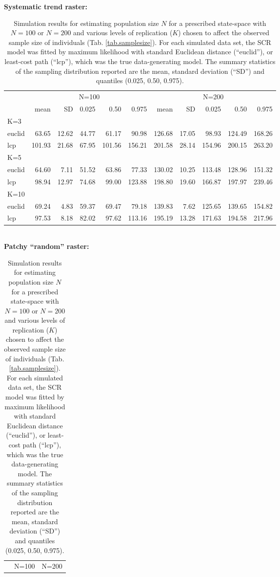 \begin{table}[htp]
\label{tab.results1}
{\small
\caption{Simulation results for estimating population size $N$ for a prescribed state-space with
$N=100$ or $N=200$ and various levels of replication ($K$) chosen to affect the observed sample
size of individuals (Tab. \ref{tab.samplesize}). For each simulated
data set, the SCR model was fitted by maximum likelihood with
standard Euclidean distance (``euclid''), or least-cost path
(``lcp''), which was the true data-generating model.
The summary statistics of the
sampling distribution reported are the mean, standard deviation
(``SD'') and quantiles (0.025, 0.50, 0.975).
}
{\bf Systematic trend raster:} \\
\begin{tabular}{l|rrrrr|rrrrr}
         & \multicolumn{5}{c}{N=100   } & \multicolumn{5}{c}{N=200  }  \\
         &   mean &  SD  & 0.025 & 0.50 & 0.975  & mean  & SD   & 0.025 & 0.50  & 0.975 \\ \hline
K=3      &        &      &       &      &        &       &      &       &       &       \\
euclid   &   63.65& 12.62& 44.77 & 61.17&  90.98 & 126.68& 17.05&  98.93& 124.49& 168.26 \\
lcp      &  101.93& 21.68& 67.95 &101.56& 156.21 & 201.58& 28.14& 154.96& 200.15& 263.20\\
K=5      &        &      &       &      &        &       &      &       &       &        \\
euclid   &  64.60 & 7.11 & 51.52 & 63.86&  77.33 & 130.02& 10.25& 113.48& 128.96& 151.32\\
lcp      &  98.94 &12.97 & 74.68 & 99.00& 123.88 & 198.80& 19.60& 166.87& 197.97& 239.46\\
K=10     &        &      &       &      &        &       &      &       &       &       \\
euclid   &  69.24 & 4.83 & 59.37 & 69.47&  79.18 & 139.83&  7.62& 125.65& 139.65& 154.82\\
lcp      &  97.53 & 8.18 & 82.02 & 97.62& 113.16 & 195.19& 13.28& 171.63& 194.58& 217.96\\ \hline
\end{tabular}
\\
{\bf Patchy ``random'' raster: } \\
\begin{tabular}{l|rrrrrrrrrr}
         & \multicolumn{5}{c}{N=100  } & \multicolumn{5}{c}{N=200   }  \\

\end{tabular}}
\end{table}
